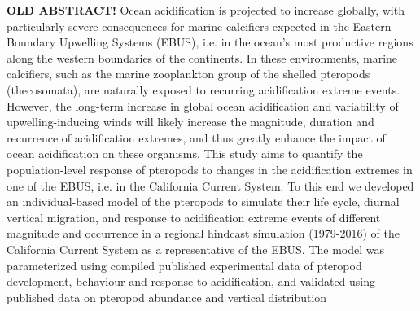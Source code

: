 

\noindent
\textbf{OLD ABSTRACT!}
Ocean acidification is projected to increase globally, with particularly severe consequences for marine calcifiers expected in the Eastern Boundary Upwelling Systems (EBUS), i.e. in the ocean’s most productive regions along the western boundaries of the continents. In these environments, marine calcifiers, such as the marine zooplankton group of the shelled pteropods (thecosomata), are naturally exposed to recurring acidification extreme events. However, the long-term increase in global ocean acidification and variability of upwelling-inducing winds will likely increase the magnitude, duration and recurrence of acidification extremes, and thus greatly enhance the impact of ocean acidification on these organisms. This study aims to quantify the population-level response of pteropods to changes in the acidification extremes in one of the EBUS, i.e. in the California Current System. To this end we developed an individual-based model of the pteropods to simulate their life cycle, diurnal vertical migration, and response to acidification extreme events of different magnitude and occurrence in a regional hindcast simulation (1979-2016) of the California Current System as a representative of the EBUS. The model was parameterized using compiled published experimental data of pteropod development, behaviour and response to acidification, and validated using published data on pteropod abundance and vertical distribution






